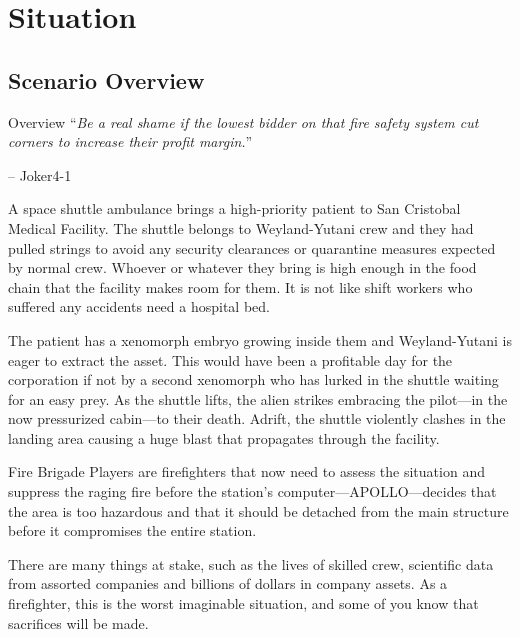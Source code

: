 \chapter{Situation}



\section{Scenario Overview}



\begin{rpg-commentbox}{Overview}
    ``\textit{Be a real shame if the lowest bidder on that fire safety system cut corners to increase their profit margin.}''

    \begin{flushright}
    -- Joker4-1
    \end{flushright}

    A space shuttle ambulance brings a high-priority patient to San Cristobal Medical Facility. The shuttle belongs to Weyland-Yutani crew and they had pulled strings to avoid any security clearances or quarantine measures expected by normal crew. Whoever or whatever they bring is high enough in the food chain that the facility makes room for them. It is not like shift workers who suffered any accidents need a hospital bed.
    
    The patient has a xenomorph embryo growing inside them and  Weyland-Yutani is eager to extract the asset. This would have been a profitable day for the corporation if not by a second xenomorph who has lurked in the shuttle waiting for an easy prey. As the shuttle lifts, the alien strikes embracing the pilot---in the now pressurized cabin---to their death. Adrift, the shuttle violently clashes in the landing area causing a
    huge blast that propagates through the facility.
\end{rpg-commentbox}


\begin{rpg-commentbox}{Fire Brigade}
    Players are firefighters that now need to assess the situation and suppress 
    the raging fire before the station's computer---APOLLO---decides that the area is too hazardous and that it should be detached from the main structure before it compromises the entire station.

    There are many things at stake, such as the lives of skilled crew, 
    scientific data from assorted companies and billions of dollars in company assets. As a firefighter, this is the worst imaginable situation, and some of 
    you know that sacrifices will be made.
\end{rpg-commentbox}


